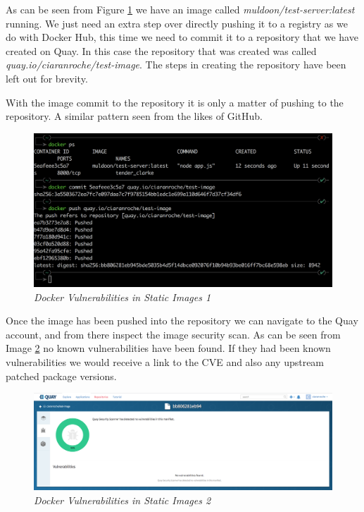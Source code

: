 As can be seen from Figure \ref{img:demo16} we have an image called \textit{muldoon/test-server:latest} running. We just need an extra step over directly pushing it to a registry as we do with Docker Hub, this time we need to commit it to a repository that we have created on Quay. In this case the repository that was created was called \textit{quay.io/ciaranroche/test-image}. The steps in creating the repository have been left out for brevity. 

With the image commit to the repository it is only a matter of pushing to the repository. A similar pattern seen from the likes of GitHub.
\begin{figure}[!ht]
\centering
\includegraphics*[width=\textwidth]{images/term16.png}
\caption{\em Docker Vulnerabilities in Static Images 1}
\label{img:demo16}
\end{figure}

Once the image has been pushed into the repository we can navigate to the Quay account, and from there inspect the image security scan. As can be seen from Image \ref{img:demo17} no known vulnerabilities have been found. If they had been known vulnerabilities we would receive a link to the CVE and also any upstream patched package versions.
\begin{figure}[!ht]
\centering
\includegraphics*[width=\textwidth]{images/term17.png}
\caption{\em Docker Vulnerabilities in Static Images 2}
\label{img:demo17}
\end{figure}

